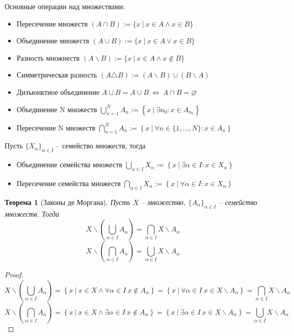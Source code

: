 \documentclass[14pt, a4paper]{article}
\newtheorem{theorem}{Теорема}[section]
\theoremstyle{definition}
\theoremstyle{remark}
\begin{document}
Основные операции над множествами:
\begin{itemize}
\item[] Пересечение множеств $(A \cap B) := \{x \ \vert \  x \in A \wedge x \in B\}$
\item[] Объединение множеств $(A \cup B) := \{x \ \vert \ x \in A \vee x \in B\}$
\item[] Разность множнеств $(A \backslash B) := \{x \ \vert \ x \in A \wedge x \notin B\}$
\item[] Симметрическая разность $(A \triangle B) := (A \backslash B) \cup (B \backslash A)$
\item[] Дизъюнктное объединение $A \sqcup B = A \cup B \ \Leftrightarrow \ A \cap B = \varnothing$
\item[] Объединение N множеств $\bigcup_{n = 1}^{N} A_n := \left\{x \ \vert \ \exists n_0 : x \in A_{n_0}\right\}$
\item[] Пересечение N множеств $\bigcap_{n = 1}^{N} A_n := \left\{x \ \vert \ \forall n \in \{1, ..., N\} : x \in A_{n}\right\}$
\end{itemize}
Пусть $\{X_\alpha\}_{\alpha \in I}$ -- семейство множеств, тогда
\begin{itemize}
\item[] Объединение семейства множеств $\bigcup_{\alpha \in I} X_\alpha := \left\{x \ \vert \ \exists \alpha \in I : x \in X_{\alpha}\right\}$
\item[] Пересечение семейства множеств $\bigcap_{\alpha \in I} X_\alpha := \left\{x \ \vert \ \forall \alpha \in I : x \in X_{\alpha}\right\}$
\end{itemize}
\begin{theorem}[Законы де Моргана]
    Пусть $X$ -- множество, $\{A_\alpha\}_{\alpha \in I}$ -- семейство множеств. Тогда
   \begin{equation}
   X \backslash \left(\bigcup_{\alpha \in I} A_\alpha \right) = \bigcap_{\alpha \in I} X \backslash A_{\alpha}
   \end{equation}
   \begin{equation}
   X \backslash \left(\bigcap_{\alpha \in I} A_\alpha \right) = \bigcup_{\alpha \in I} X \backslash A_{\alpha}
   \end{equation}
\end{theorem}
\begin{proof}
$$ X \backslash \left(\bigcup_{\alpha \in I} A_\alpha \right) = \left\{x \ \vert \ x \in X \wedge \forall \alpha \in I \ x \notin A_\alpha \right\}
= \left\{x \ \vert \ \forall \alpha \in I \ x \in X \backslash A_\alpha \right\} = \bigcap_{\alpha \in I} X \backslash A_{\alpha}$$
$$ X \backslash \left(\bigcap_{\alpha \in I} A_\alpha \right) = \left\{ x \ \vert \ x \in X \wedge \exists \alpha \in I \ x \notin A_\alpha \right\} =
\left\{x \ \vert \ \exists \alpha \in I \ x \in X \backslash A_\alpha \right\} = \bigcup_{\alpha \in I} X \backslash A_{\alpha}$$
\end{proof}
\end{document}
